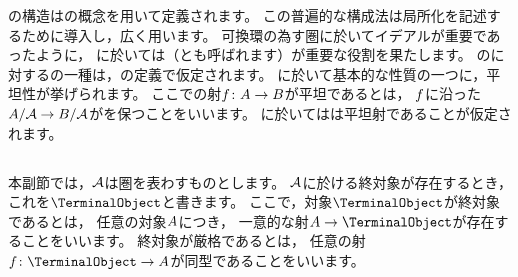 \WordZariskiCategory の構造は\WordCodisjunctor の概念を用いて定義されます。
この普遍的な構成法は局所化を記述するために導入し，広く用います。
可換環の為す圏に於いてイデアルが重要であったように，
\WordZariskiCategory に於いては\WordCongruence（\WordEffectiveEquivalenceRelation とも呼ばれます）が重要な役割を果たします。
\WordCongruence の\WordCodisjunctor に対する\WordDeMorganLaw の一種は，\WordZariskiCategory の定義で仮定されます。
\WordZariskiCategory に於いて基本的な性質の一つに，平坦性が挙げられます。
ここで\WordZariskiCategory の射\(\FunctionStyle{\Map}{\Object<A>}{\Object<B>}\)が平坦であるとは，
\(\Map\)に沿った\WordPushoutFunctor\(\UnderCategory{\Object<A>}{\ZariskiCategory}\to\UnderCategory{\Object<B>}{\ZariskiCategory}\)が\WordMonomorphism を保つことをいいます。
\WordZariskiCategory に於いては\WordCodisjunctor は平坦射であることが仮定されます。

\subsection{\WordCodisjunctor}

本副節では，\(\ZariskiCategory\)は圏を表わすものとします。
\(\ZariskiCategory\)に於ける終対象が存在するとき，
これを\(\TerminalObject\)と書きます。
ここで，対象\(\TerminalObject\)が終対象であるとは，
任意の対象\(\Object<A>\)につき，
一意的な射\(\Object<A>\to\TerminalObject\)が存在することをいいます。
終対象が厳格である\cite{21}とは，
任意の射\(\FunctionStyle{\Map}{\TerminalObject}{\Object<A>}\)が同型であることをいいます。

